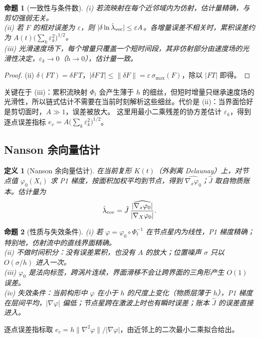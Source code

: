 \documentclass[10.5pt,a4paper]{article}
\theoremstyle{plain}
\newtheorem{prop}{命题}\newtheorem{coro}{推论}\newtheorem{defi}{定义}
\begin{document}
\begin{prop}[一致性与条件数]\label{prop:vec}
(i) 若流映射在每个近邻域内为仿射，估计量精确，与剪切强弱无关。\\
(ii) 若 $F$ 的相对误差为 $\varepsilon$，则 $|\delta\ln\hat\lambda_{\rm vec}|\le\varepsilon A$。各增量误差不相关时，累积误差约为 $A(t)\big(\sum_k\varepsilon_k^2\big)^{1/2}$。\\
(iii) 光滑速度场下，每个增量只覆盖一个短时间段，其非仿射部分由速度场的光滑性决定，$\varepsilon_k\to0$（$h\to0$），估计量一致。
\end{prop}
\begin{proof}
(ii) $\delta(FT)=\delta F\,T$，$|\delta F\,T|\le\|\delta F\|=\varepsilon\,\sigma_{\max}(F)$，除以 $|FT|$ 即得。
\end{proof}
关键在于 (iii)：累积流映射 $\Phi_t$ 会产生薄于 $h$ 的细丝，但短时增量只继承速度场的光滑性，所以链式估计不需要在当前时刻解析这些细丝。代价是 (ii)：当界面恰好是剪切面时，$A\gg1$，误差被放大。
这里用最小二乘残差的协方差估计 $\varepsilon_k$，得到逐点误差指标 $e_v=A\big(\sum_k\varepsilon_k^2\big)^{1/2}$。

\subsection{Nanson 余向量估计}

\begin{defi}[Nanson 余向量估计]
在当前复形 $K(t)$（外剥离 Delaunay）上，对节点值 $\varphi_0(X_i)$ 求 P1 梯度，按面积加权平均到节点，得到 $\widehat{\nabla_x\varphi_0}$；$\hat J$ 取自物质账本。估计量为
\begin{equation}
\hat\lambda_{\rm cov}=\hat J\,\frac{|\widehat{\nabla_x\varphi_0}|}{|\nabla_X\varphi_0|}.
\end{equation}
\end{defi}

\begin{prop}[性质与失效条件]\label{prop:cov}
(i) 若 $\varphi=\varphi_0\circ\Phi_t^{-1}$ 在节点星内为线性，P1 梯度精确；特别地，仿射流中的直线界面精确。\\
(ii) 不做时间积分：没有误差累积，也没有 $A$ 的放大；位置噪声 $\sigma$ 只以 $O(\sigma/h)$ 进入一次。\\
(iii) $\varphi_0$ 是法向标签，跨涡片连续，界面滑移不会让跨界面的三角形产生 $O(1)$ 误差。\\
(iv) 失效条件：当前构形中 $\varphi$ 在小于 $h$ 的尺度上变化（物质层薄于 $h$），P1 梯度在层间平均，$|\nabla\varphi|$ 偏低；节点星跨在激波上时也有瞬时误差；账本 $\hat J$ 的误差直接进入。
\end{prop}
逐点误差指标取 $e_c=h\|\nabla^2\varphi\|/|\nabla\varphi|$，由近邻上的二次最小二乘拟合给出。
\end{document}
